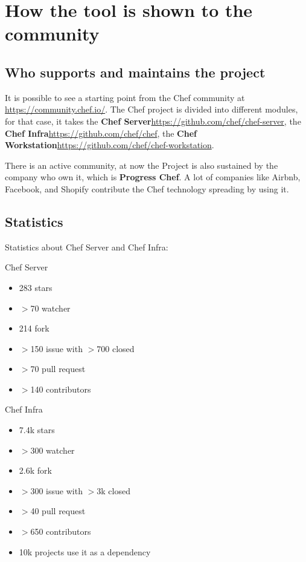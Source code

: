 \documentclass[12pt,a4paper,openright,twoside]{book}
\begin{document}
\section{How the tool is shown to the community}

\subsection{Who supports and maintains the project}
It is possible to see a starting point from the Chef community at \url{https://community.chef.io/}.
The Chef project is divided into different modules, for that case, it takes the \textbf{Chef Server}\url{https://github.com/chef/chef-server},
the \textbf{Chef Infra}\url{https://github.com/chef/chef}, the \textbf{Chef Workstation}\url{https://github.com/chef/chef-workstation}.

There is an active community, at now the Project is also sustained by the company who own it, which is \textbf{Progress Chef}.
A lot of companies like Airbnb, Facebook, and Shopify contribute the Chef technology spreading by using it.

\subsection{Statistics}
Statistics about Chef Server and Chef Infra:


Chef Server


\begin{itemize}
    \item 283 stars
    \item $>$70 watcher
    \item 214 fork
    \item $>$150 issue with $>$700 closed
    \item $>$70 pull request
    \item $>$140 contributors
\end{itemize}


Chef Infra


\begin{itemize}
    \item 7.4k stars
    \item $>$300 watcher
    \item 2.6k fork
    \item $>$300 issue with $>$3k closed
    \item $>$40 pull request
    \item $>$650 contributors
    \item 10k projects use it as a dependency
\end{itemize}
\end{document}
